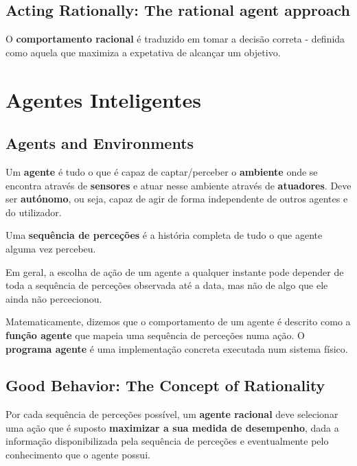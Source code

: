 \documentclass[12pt]{article}
\begin{document}
\subsection{Acting Rationally: The rational agent approach}

O \textbf{comportamento racional} é traduzido em tomar a decisão correta - definida como aquela que maximiza a expetativa de alcançar um objetivo.

\newpage

\section{Agentes Inteligentes}

\subsection{Agents and Environments}

Um \textbf{agente} é tudo o que é capaz de captar/perceber o \textbf{ambiente} onde se encontra através de \textbf{sensores} e atuar nesse ambiente através de \textbf{atuadores}. Deve ser \textbf{autónomo}, ou seja, capaz de agir de forma independente de outros agentes e do utilizador.\vspace{10pt}

Uma \textbf{sequência de perceções} é a história completa de tudo o que agente alguma vez percebeu.\vspace{10pt}

Em geral, a escolha de ação de um agente a qualquer instante pode depender de toda a sequência de perceções observada até a data, mas não de algo que ele ainda não percecionou.\vspace{10pt}

Matematicamente, dizemos que o comportamento de um agente é descrito como a \textbf{função agente} que mapeia uma sequência de perceções numa ação. O \textbf{programa agente} é uma implementação concreta executada num sistema físico.

\subsection{Good Behavior: The Concept of Rationality}

Por cada sequência de perceções possível, um \textbf{agente racional} deve selecionar uma ação que é suposto \textbf{maximizar a sua medida de desempenho}, dada a informação disponibilizada pela sequência de perceções e eventualmente pelo conhecimento que o agente possui.\vspace{10pt}
\end{document}
